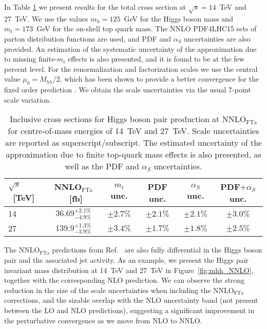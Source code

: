 In Table \ref{table:HH_at_NNLO} we present results for the total cross section at $\sqrt{s} = 14$~TeV and 27~TeV.
We use the values $m_h = 125$~GeV for the Higgs boson mass and $m_t = 173$~GeV for the  on-shell top quark mass.
The NNLO PDF4LHC15 sets of parton distribution functions are used, and PDF and $\alpha_S$ uncertainties are also provided.
An estimation of the systematic uncertainty of the approximation due to missing finite-$m_t$ effects is also presented, and it is found to be at the few percent level.
For the renormalization and factorization scales we use the central value $\mu_0 = M_{hh}/2$, which has been shown to provide a better convergence for the fixed order prediction \cite{deFlorian:2018tah}. We obtain the scale uncertainties via the usual 7-point scale variation.

{\renewcommand{\arraystretch}{1.6}
\begin{table}
\begin{center}
\begin{tabular}{|l|c|c|c|c|c|}
\hline
$\sqrt{s}$~[TeV] & NNLO$_{\mathrm{FTa}}$~[fb] & $m_t$ unc. & PDF unc. & $\alpha_S$ unc. & PDF$+\alpha_S$ unc. \\
 \hline
$14$ & $36.69^{+2.1\%}_{-4.9\%}$ & $\pm 2.7\%$ & $\pm 2.1\%$ & $\pm 2.1\%$ & $\pm 3.0\%$ \\
\hline
$27$ & $139.9^{+1.3\%}_{-3.9\%}$ & $\pm 3.4\%$ & $\pm 1.7\%$ & $\pm 1.8\%$ & $\pm 2.5\%$ \\
\hline
\end{tabular}
\end{center}
\caption{
Inclusive cross sections for Higgs boson pair production at NNLO$_{\mathrm{FTa}}$ for centre-of-mass energies of 14~TeV and 27~TeV. 
Scale uncertainties are reported as superscript/subscript.
The estimated uncertainty of the approximation due to finite top-quark mass effects is also presented, as well as the PDF and $\alpha_S$ uncertainties.
}
\label{table:HH_at_NNLO}
\end{table}
}


The NNLO$_{\mathrm{FTa}}$ predictions from Ref.~\cite{Grazzini:2018bsd} are also fully differential in the Higgs boson pair and the associated jet activity.
As an example, we present the Higgs pair invariant mass distribution at 14~TeV and 27~TeV in Figure~\ref{fig:mhh_NNLO}, together with the corresponding NLO prediction.
We can observe the strong reduction in the size of the scale uncertainties when including the NNLO$_{\mathrm{FTa}}$ corrections, and the sizable overlap with the NLO uncertainty band (not present between the LO and NLO predictions), suggesting a significant improvement in the perturbative convergence as we move from NLO to NNLO.


